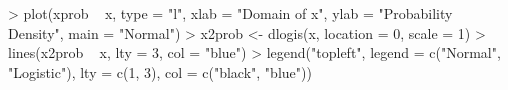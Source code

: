 \begin{Schunk}
\begin{Sinput}
> plot(xprob ~ x, type = "l", xlab = "Domain of x", ylab = "Probability Density", main = "Normal")
> x2prob <- dlogis(x, location = 0, scale = 1)
> lines(x2prob ~ x, lty = 3, col = "blue")
> legend("topleft", legend = c("Normal", "Logistic"), lty = c(1, 3), col = c("black", "blue"))
\end{Sinput}
\end{Schunk}
